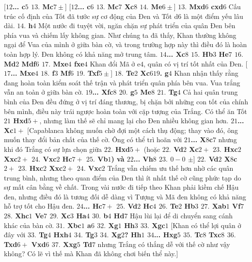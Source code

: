 \begin{multicols}{2}
	\vskip 0.1cm
	[\textbf{\color{gocco}$12$... c$5$ $13.$ Mc$7\pm$}]
	\vskip 0.1cm
	[\textbf{\color{gocco}$12$... c$6$ $13.$ Mc$7$ Xc$8$ $14.$ Me$6 \pm$}]
	\vskip 0.1cm
	\textbf{\color{gocco}$13.$ Mxd$6$ cxd$6$}  Cấu trúc cố định của Tốt đã tước sự cơ động của Đen và Tốt d6 là một điểm yếu lâu dài.
	\vskip 0.1cm
	\textbf{\color{gocco}$14.$ h$4$} Một nước đi tuyệt vời, ngăn chặn sự phát triển của quân Đen bên phía vua và chiếm lấy không gian. Như chúng ta đã thấy, Khan thường không ngại để Vua của mình ở giữa bàn cờ, và trong trường hợp này thì điều đó là hoàn toàn hợp lý. Đen không có khả năng mở trung tâm. \textbf{\color{gocco}$14$... Xc$8$ $15.$ Hb$3$ He$7$ $16.$ Md$2$ Mdf$6$ $17.$ Mxe$4$ fxe$4$} Khan đổi Mã ở e$4$, quân có vị trí tốt nhất của Đen. 
	\vskip 0.1cm
	[\textbf{\color{gocco}$17$... Mxe$4$ $18.$ f$3$ Mf$6$ $19.$ Txf$5\pm$}]
	\vskip 0.1cm
	\textbf{\color{gocco}$18.$ Te$2$ Xc$619$. g$4$} Khan nhận thấy rằng đang hoàn toàn kiểm soát thế trận và phát triển quân phía bên vua. Vua trắng vẫn an toàn ở giữa bàn cờ. \textbf{\color{gocco}$19$... Xfc$8$ $20.$ g$5$ Me$8$ $21.$ Tg$4$}
	\vskip 0.1cm 
	Cả hai quân trung bình của Đen đều đứng ở vị trí đáng thương, bị chặn bởi những con tốt của chính bên mình, điều này trái ngược hoàn toàn với cặp tượng của Trắng. Có thể ăn Tốt \textbf{\color{gocco}$21$ Hxd$5+$}, nhưng làm thế sẽ chỉ mang lại cho Đen nhiều không gian hơn. \textbf{\color{gocco}$21$... Xc$1+$} 
	\vskip 0.1cm
	[Capablanca không muốn chờ đợi một cách thụ động; thay vào đó, ông muốn thay đổi bản chất của thế cờ. Ông có thể trì hoãn với  \textbf{\color{gocco}$21$... X$8$c$7$} nhưng khi đó Trắng có sự lựa chọn giữa  \textbf{\color{gocco}$22.$ Hxd$5+$}  (hoặc \textbf{\color{gocco}$22.$ Vd$2$ Xc$2+$ $23.$ Hxc$2$ Xxc$2+$ $24.$ Vxc$2$ Hc$7+$ $25.$ Vb$1$) và $22$... Vh$8$ $23.$ $0-0$ $\pm$}]
	\vskip 0.1cm
	\textbf{\color{gocco}$22.$ Vd$2$ X$8$c$2+$ $23.$ Hxc$2$ Xxc$2+$ $24.$ Vxc$2$} Trắng vẫn chiếm ưu thế hơn nhờ các quân trung bình, nhưng theo quan điểm của Đen thì ít nhất thế cờ cũng phức tạp do sự mất cân bằng về chất. Trong vài nước đi tiếp theo Khan phải kiềm chế Hậu đen, nhưng điều đó là tương đối dễ dàng vì Tượng và Mã đen không có khả năng hỗ trợ tốt cho Hậu đen. 
	\vskip 0.1cm
	\textbf{\color{gocco}$24$... Hc$7+$ $25.$ Vd$2$ Hc$4$ $26.$ Te$2$ Hb$3$ $27.$ Xab$1$ Vf$7$ $28.$ Xhc$1$ Ve$7$ $29.$ Xc$3$ Ha$4$ $30.$ b$4$ Hd$7$} Hậu lùi lại để di chuyển sang cánh khác của bàn cờ. \textbf{\color{gocco}$31.$ Xbc$1$ a$6$ $32.$ Xg$1$ Hh$3$ $33.$ Xgc$1$} 
	\vskip 0.1cm
	[Khan có thể lợi quân ở đây với \textbf{\color{gocco}$33.$ Tg$4$ Hxh$4$ $34.$ Tg$3$ $34.$ Xg$2$? Hh$1$ $34$... Hxg$5$ $35.$ Tc$8$ Txc$8$ $36.$ Txd$6+$ Vxd$6$ $37.$ Xxg$5$ Td$7$} nhưng Trắng có thắng dễ với thế cờ như vậy không? Có lẽ vì thế mà Khan đã không chơi biến thể này.]

\end{multicols}
